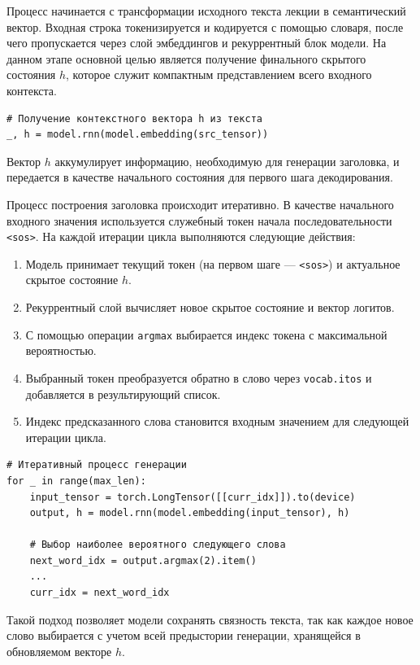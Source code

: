 \documentclass[coursework]{SCWorks}
\begin{document}
    Процесс начинается с трансформации исходного текста лекции в семантический вектор.
    Входная строка токенизируется и кодируется с помощью словаря, после чего пропускается через слой
    эмбеддингов и рекуррентный блок модели.
    На данном этапе основной целью является получение финального скрытого состояния $h$,
    которое служит компактным представлением всего входного контекста.

    \begin{verbatim}
# Получение контекстного вектора h из текста
_, h = model.rnn(model.embedding(src_tensor))
    \end{verbatim}

    Вектор $h$ аккумулирует информацию, необходимую для генерации заголовка,
    и передается в качестве начального состояния для первого шага декодирования.

    Процесс построения заголовка происходит итеративно.
    В качестве начального входного значения используется служебный токен начала последовательности \texttt{<sos>}.
    На каждой итерации цикла выполняются следующие действия:
    \begin{enumerate}
        \item Модель принимает текущий токен (на первом шаге — \texttt{<sos>}) и актуальное скрытое состояние $h$.
        \item Рекуррентный слой вычисляет новое скрытое состояние и вектор логитов.
        \item С помощью операции \texttt{argmax} выбирается индекс токена с максимальной вероятностью.
        \item Выбранный токен преобразуется обратно в слово через \texttt{vocab.itos} и добавляется в результирующий список.
        \item Индекс предсказанного слова становится входным значением для следующей итерации цикла.
    \end{enumerate}

    \begin{verbatim}
# Итеративный процесс генерации
for _ in range(max_len):
    input_tensor = torch.LongTensor([[curr_idx]]).to(device)
    output, h = model.rnn(model.embedding(input_tensor), h)

    # Выбор наиболее вероятного следующего слова
    next_word_idx = output.argmax(2).item()
    ...
    curr_idx = next_word_idx
    \end{verbatim}

    Такой подход позволяет модели сохранять связность текста,
    так как каждое новое слово выбирается с учетом всей предыстории генерации, хранящейся в обновляемом векторе $h$.
\end{document}
